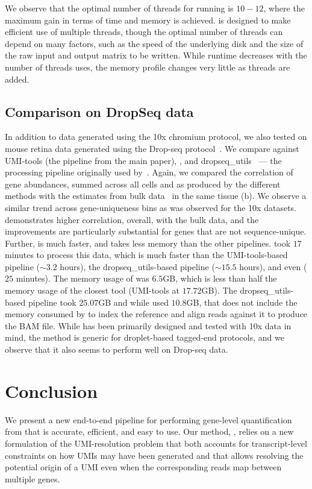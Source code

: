 We observe that the optimal number of threads for running \alevin is $10-12$, where the maximum gain in terms of time and memory is achieved. \Alevin is designed to make efficient use of multiple threads, though the optimal number of threads can depend on many factors, such as the speed of the underlying disk and the size of the raw input and output matrix to be written. While runtime decreases with the number of threads uses, the memory profile changes very little as threads are added. 

\subsection{Comparison on DropSeq data}
In addition to data generated using the 10x chromium protocol\cite{tenx}, we 
also tested \alevin on mouse retina data generated using the Drop-seq protocol~\citep{dropseq}. 
We compare \alevin against UMI-tools (the \naive pipeline    
from the main paper), \dropest, and dropseq\_utils~\citep{dropseq} --- the processing    
pipeline originally used by~\citet{dropseq}.   
 Again, we compared the correlation of gene abundances, summed across all cells    
and as produced by the different methods with the estimates from bulk    
data~\citep{mouse_retina} in the same tissue (b). We observe a    
similar trend across gene-uniqueness bins as was observed for the 10x datasets.    
\Alevin demonstrates higher correlation, overall, with the bulk data, and the    
improvements are particularly substantial for genes that are not    
sequence-unique. Further, \alevin is much faster, and takes less memory than    
the other pipelines. \Alevin took $17$ minutes to process this data, which is much faster than the UMI-tools-based    
pipeline ($\sim3.2$ hours), the dropseq\_utils-based pipeline ($\sim15.5$    
hours), and even \dropest ($25$ minutes). The memory usage of \alevin was $6.5$GB, which is less than half the    
memory usage of the closest tool (UMI-tools at $17.72$GB).
The dropseq\_utils-based pipeline took $25.07$GB and while \dropest used
$10.8$GB, that does not include the memory consumed by \cellr to index the reference and align reads against it to
produce the BAM file.
While \alevin has been primarily designed and tested with 10x data in mind, the method
is generic for droplet-based tagged-end protocols, and we observe that it also seems to perform
well on Drop-seq data. 

\section{Conclusion}
We present a new end-to-end pipeline for performing gene-level quantification
from \dscrnaseq that is accurate, efficient, and easy to use. Our method,
\Alevin, relies on a new formulation of the UMI-resolution problem that both
accounts for transcript-level constraints on how UMIs may have been generated
and that allows resolving the potential origin of a UMI even when the
corresponding reads map between multiple genes.

